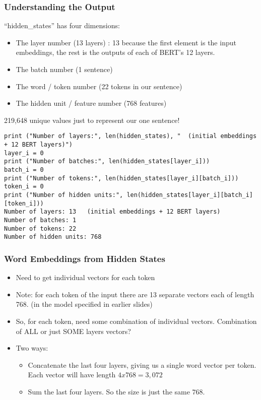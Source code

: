 \begin{frame}[fragile]\frametitle{Understanding the Output}

``hidden\_states'' has four dimensions:

\begin{itemize}
\item The layer number (13 layers) : 13 because the first element is the input embeddings, the rest is the outputs of each of BERT's 12 layers.
\item The batch number (1 sentence)
\item The word / token number (22 tokens in our sentence)
\item The hidden unit / feature number (768 features)
\end{itemize}

219,648 unique values just to represent our one sentence!

\begin{lstlisting}
print ("Number of layers:", len(hidden_states), "  (initial embeddings + 12 BERT layers)")
layer_i = 0
print ("Number of batches:", len(hidden_states[layer_i]))
batch_i = 0
print ("Number of tokens:", len(hidden_states[layer_i][batch_i]))
token_i = 0
print ("Number of hidden units:", len(hidden_states[layer_i][batch_i][token_i]))
Number of layers: 13   (initial embeddings + 12 BERT layers)
Number of batches: 1
Number of tokens: 22
Number of hidden units: 768
\end{lstlisting}

\end{frame}

\begin{frame}[fragile]\frametitle{Word Embeddings from Hidden States}

\begin{itemize}
\item Need to get individual vectors for each token
\item Note: for each token of the input there are 13 separate vectors each of length 768. (in the model specified in earlier slides)
\item So, for each token, need some combination of individual vectors. Combination of ALL or just SOME layers vectors?
\item Two ways:
\begin{itemize}
\item Concatenate the last four layers, giving us a single word vector per token. Each vector will have length $4 x 768 = 3,072$
\item Sum the last four layers. So the size is just the same $768$.
\end{itemize}
\end{itemize}
\end{frame}


